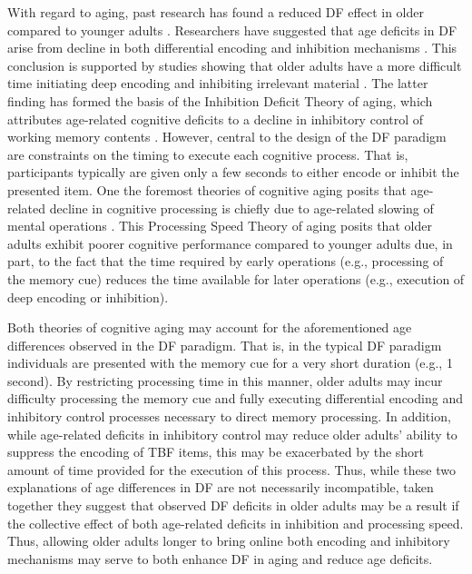 \documentclass[man]{apa6}\usepackage[]{graphicx}\usepackage[]{color}
\begin{document}
With regard to aging, past research has found a reduced DF effect in older compared to younger adults \parencite{andres.vanderlinden.parmentier2004,collette.et.al.2009,dulaney.marks.link2004,earles.kersten2002,feyereisen.charot2008,gamboz.russo2002,hasher.zacks.rahhal1999,hogge.adam.collette2008,lustig.hasher.zacks2007,sego.golding.gottlob2006} \parencite[see][for meta-analysis and review]{zachs.hasher1994,zacks.radvansky.hasher1996,titz.verhaeghen2010}. Researchers have suggested that age deficits in DF arise from decline in both differential encoding and inhibition mechanisms \parencite{zacks.radvansky.hasher1996, zacks.hasher.li2000, hogge.adam.collette2008}. This conclusion is supported by studies showing that older adults have a more difficult time initiating deep encoding \parencite[for review, see]{craik.rose2012} and inhibiting irrelevant material \parencite[e.g.,]{troyer.leach.strauss2006, lawo.et.al.2012}. The latter finding has formed the basis of the Inhibition Deficit Theory of aging, which attributes age-related cognitive deficits to a decline in inhibitory control of working memory contents \parencite{hasher.zacks1988,zacks.hasher.li2000}. However, central to the design of the DF paradigm are constraints on the timing to execute each cognitive process. That is, participants typically are given only a few seconds to either encode or inhibit the presented item. One the foremost theories of cognitive aging posits that age-related decline in cognitive processing is chiefly due to age-related slowing of mental operations \parencite{salthouse1996}. This Processing Speed Theory of aging posits that older adults exhibit poorer cognitive performance compared to younger adults due, in part, to the fact that the time required by early operations (e.g., processing of the memory cue) reduces the time available for later operations (e.g., execution of deep encoding or inhibition).

Both theories of cognitive aging may account for the aforementioned age differences observed in the DF paradigm. That is, in the typical DF paradigm individuals are presented with the memory cue for a very short duration (e.g., 1 second). By restricting processing time in this manner, older adults may incur difficulty processing the memory cue and fully executing differential encoding and inhibitory control processes necessary to direct memory processing. In addition, while age-related deficits in inhibitory control may reduce older adults’ ability to suppress the encoding of TBF items, this may be exacerbated by the short amount of time provided for the execution of this process. Thus, while these two explanations of age differences in DF are not necessarily incompatible, taken together they suggest that observed DF deficits in older adults may be a result if the collective effect of both age-related deficits in inhibition and processing speed. Thus, allowing older adults longer to bring online both encoding and inhibitory mechanisms may serve to both enhance DF in aging and reduce age deficits.
\end{document}

